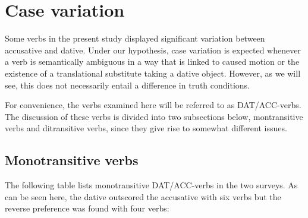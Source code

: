 \documentclass[output=paper,modfonts,nonflat]{langsci/langscibook}
\begin{document}
\section{Case variation}  %

Some verbs in the present study displayed significant variation between accusative and dative. Under our hypothesis, case variation is expected whenever a verb is semantically ambiguous in a way that is linked to caused motion or the existence of a translational substitute taking a dative object. However, as we will see, this does not necessarily entail a difference in truth conditions.

For convenience, the verbs examined here will be referred to as DAT/ACC-verbs. The discussion of these verbs is divided into two subsections below, montransitive verbs and ditransitive verbs, since they give rise to somewhat different issues.

\subsection{Monotransitive verbs} %

The following table lists monotransitive DAT/ACC-verbs in the two surveys. As can be seen here, the dative outscored the accusative with six verbs but the reverse preference was found with four verbs: 

\tablefirsthead{}
\end{document}
